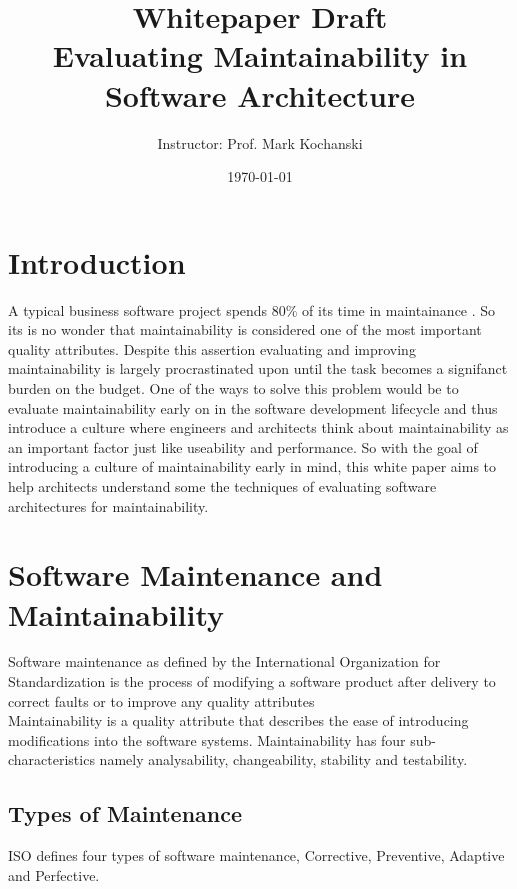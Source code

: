 \documentclass[dvips,12pt]{article}
\title{ Whitepaper Draft\\
Evaluating Maintainability in Software Architecture}
\author{\Author \and
Instructor: Prof. Mark Kochanski}
\date{\today}
\begin{document}



\maketitle
\newpage
\tableofcontents
\newpage

\section{Introduction}
A typical business software project spends 80\% of its time in maintainance \cite{pigoski_practical_1996}. So its is no wonder that maintainability is considered one of the most important quality attributes. Despite this assertion evaluating and improving maintainability is largely procrastinated upon until the task becomes a signifanct burden on the budget. One of the ways to solve this problem would be to evaluate maintainability early on in the software development lifecycle and thus introduce a culture where engineers and architects think about maintainability as an important factor just like useability and performance. So with the goal of introducing a culture of maintainability early in mind, this white paper aims to help architects understand some the techniques of evaluating software architectures for maintainability.


\section{Software Maintenance and Maintainability}
Software maintenance as defined by the International Organization for Standardization is the process of modifying a software product after delivery to correct faults or to improve any quality attributes \cite{_international_2006} \\

Maintainability is a quality attribute that describes the ease of introducing modifications into the software systems. Maintainability has four sub-characteristics namely analysability, changeability, stability and testability\cite{_international_2006}.\\

\subsection{Types of Maintenance}
ISO defines four types of software maintenance, Corrective, Preventive, Adaptive and Perfective. \\
\end{document}
